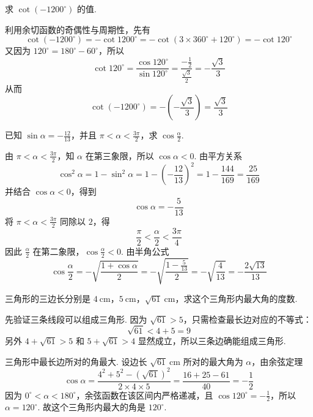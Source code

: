 \begin{problem}
求 \(\cot\left(-1200^\circ\right)\) 的值.
\end{problem}

\begin{solution}
利用余切函数的奇偶性与周期性，先有
\[
\cot\left(-1200^\circ\right)=-\cot1200^\circ=-\cot\left(3\times360^\circ+120^\circ\right)=-\cot120^\circ
\]
又因为 \(120^\circ=180^\circ-60^\circ\)，所以
\[
\cot120^\circ=\frac{\cos120^\circ}{\sin120^\circ}
=\frac{-\frac12}{\frac{\sqrt3}{2}}=-\frac{\sqrt3}{3}
\]
从而
\[
\cot\left(-1200^\circ\right)=-\left(-\frac{\sqrt3}{3}\right)=\frac{\sqrt3}{3}
\]
\end{solution}

\begin{problem}
已知 \(\sin\alpha=-\frac{12}{13}\)，并且 \(\pi<\alpha<\frac{3\pi}{2}\)，求 \(\cos\frac{\alpha}{2}\).
\end{problem}

\begin{solution}
由 \(\pi<\alpha<\frac{3\pi}{2}\)，知 \(\alpha\) 在第三象限，所以 \(\cos\alpha<0\). 由平方关系
\[
\cos^2\alpha=1-\sin^2\alpha=1-\left(-\frac{12}{13}\right)^2=1-\frac{144}{169}=\frac{25}{169}
\]
并结合 \(\cos\alpha<0\)，得到
\[
\cos\alpha=-\frac5{13}
\]
将 \(\pi<\alpha<\frac{3\pi}{2}\) 同除以 \(2\)，得
\[
\frac\pi2<\frac\alpha2<\frac{3\pi}{4}
\]
因此 \(\frac\alpha2\) 在第二象限，\(\cos\frac\alpha2<0\). 由半角公式
\[
\cos\frac\alpha2=-\sqrt{\frac{1+\cos\alpha}{2}}
=-\sqrt{\frac{1-\frac5{13}}{2}}
=-\sqrt{\frac4{13}}
=-\frac{2\sqrt{13}}{13}
\]
\end{solution}

\begin{problem}
三角形的三边长分别是 \(4\mathrm{~cm}\)，\(5\mathrm{~cm}\)，\(\sqrt{61}\mathrm{~cm}\)，求这个三角形内最大角的度数.
\end{problem}

\begin{solution}
先验证三条线段可以组成三角形. 因为 \(\sqrt{61}>5\)，只需检查最长边对应的不等式：
\[
\sqrt{61}<4+5=9
\]
另外 \(4+\sqrt{61}>5\) 和 \(5+\sqrt{61}>4\) 显然成立，所以三条边确能组成三角形.

三角形中最长边所对的角最大. 设边长 \(\sqrt{61}\mathrm{~cm}\) 所对的最大角为 \(\alpha\)，由余弦定理
\[
\cos\alpha=\frac{4^2+5^2-\left(\sqrt{61}\right)^2}{2\times4\times5}
=\frac{16+25-61}{40}=-\frac12
\]
因为 \(0^\circ<\alpha<180^\circ\)，余弦函数在该区间内严格递减，且 \(\cos120^\circ=-\frac12\)，所以 \(\alpha=120^\circ\). 故这个三角形内最大的角是 \(120^\circ\).
\end{solution}

